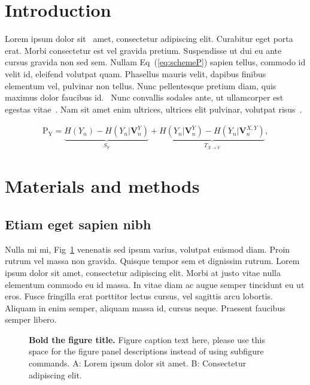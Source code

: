 \documentclass[10pt,letterpaper]{article}
\begin{document}
\section*{Introduction}
Lorem ipsum dolor sit~\cite{bib1} amet, consectetur adipiscing elit. Curabitur eget porta erat. Morbi consectetur est vel gravida pretium. Suspendisse ut dui eu ante cursus gravida non sed sem. Nullam Eq~(\ref{eq:schemeP}) sapien tellus, commodo id velit id, eleifend volutpat quam. Phasellus mauris velit, dapibus finibus elementum vel, pulvinar non tellus. Nunc pellentesque pretium diam, quis maximus dolor faucibus id.~\cite{bib2} Nunc convallis sodales ante, ut ullamcorper est egestas vitae~\cite{bib3}. Nam sit amet enim ultrices, ultrices elit pulvinar, volutpat risus~\cite{bib4}.

\begin{eqnarray}
\label{eq:schemeP}
	\mathrm{P_Y} = \underbrace{H(Y_n) - H(Y_n|\mathbf{V}^{Y}_{n})}_{S_Y} + \underbrace{H(Y_n|\mathbf{V}^{Y}_{n})- H(Y_n|\mathbf{V}^{X,Y}_{n})}_{T_{X\rightarrow Y}},
\end{eqnarray}

\section*{Materials and methods}
\subsection*{Etiam eget sapien nibh}

Nulla mi mi, Fig~\ref{fig1} venenatis sed ipsum varius, volutpat euismod diam. Proin rutrum vel massa non gravida. Quisque tempor sem et dignissim rutrum. Lorem ipsum dolor sit amet, consectetur adipiscing elit. Morbi at justo vitae nulla elementum commodo eu id massa. In vitae diam ac augue semper tincidunt eu ut eros. Fusce fringilla erat porttitor lectus cursus,  vel sagittis arcu lobortis. Aliquam in enim semper, aliquam massa id, cursus neque. Praesent faucibus semper libero.

\begin{figure}[!h]
\caption{\textbf{Bold the figure title.}
Figure caption text here, please use this space for the figure panel descriptions instead of using subfigure commands. A: Lorem ipsum dolor sit amet. B: Consectetur adipiscing elit.}
\label{fig1}
\end{figure}
\end{document}
